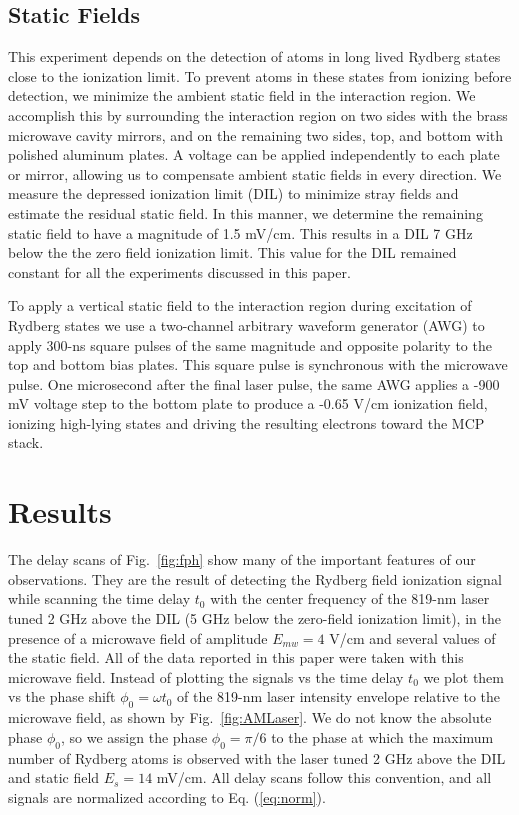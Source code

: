 \documentclass[aps,pra,reprint,groupedaddress]{revtex4-1}
\begin{document}
\subsection{\label{fields} Static Fields}

This experiment depends on the detection of atoms in long lived Rydberg states close to the ionization limit. To prevent atoms in these states from ionizing before detection, we minimize the ambient static field in the interaction region. We accomplish this by surrounding the interaction region on two sides with the brass microwave cavity mirrors, and on the remaining two sides, top, and bottom with polished aluminum plates. A voltage can be applied independently to each plate or mirror, allowing us to compensate ambient static fields in every direction. We measure the depressed ionization limit (DIL) to minimize stray fields and estimate the residual static field. In this manner, we determine the remaining static field to have a magnitude of 1.5 mV/cm. This results in a DIL 7 GHz below the the zero field ionization limit. This value for the DIL remained constant for all the experiments discussed in this paper.

To apply a vertical static field to the interaction region during excitation of Rydberg states we use a two-channel arbitrary waveform generator (AWG) to apply 300-ns square pulses of the same magnitude and opposite polarity to the top and bottom bias plates. This square pulse is synchronous with the microwave pulse. One microsecond after the final laser pulse, the same AWG applies a -900 mV voltage step to the bottom plate to produce a -0.65 V/cm ionization field, ionizing high-lying states and driving the resulting electrons toward the MCP stack.

\section{\label{results} Results}

The delay scans of Fig.~\ref{fig:fph} show many of the important features of our observations. They are the result of detecting the Rydberg field ionization signal while scanning the time delay $t_0$ with the center frequency of the 819-nm laser tuned 2 GHz above the DIL (5 GHz below the zero-field ionization limit), in the presence of a microwave field of amplitude $E_{mw}=4$ V/cm and several values of the static field. All of the data reported in this paper were taken with this microwave field. Instead of plotting the signals vs the time delay $t_0$ we plot them vs the phase shift $\phi_0=\omega t_0$ of the 819-nm laser intensity envelope relative to the microwave field, as shown by Fig.~\ref{fig:AMLaser}. We do not know the absolute phase $\phi_0$, so we assign the phase $\phi_0=\pi/6$ to the phase at which the maximum number of Rydberg atoms is observed with the laser tuned 2 GHz above the DIL and static field $E_s = 14$ mV/cm. All delay scans follow this convention, and all signals are normalized according to Eq. (\ref{eq:norm}).
\end{document}
